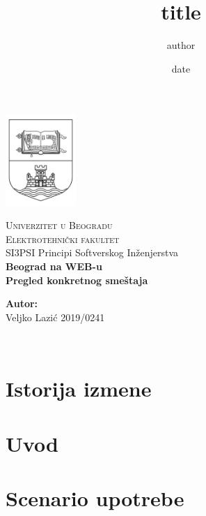 \documentclass[12pt]{report}
\begin{document}
\title{title}
\author{author}
\date{date}

\begin{titlepage}
\begin{center}
    \includegraphics[width=0.2\textwidth]{logo.jpg}
\end{center}
\begin{center}
    \textsc{ \LARGE{Univerzitet u Beogradu \\}}
	\textsc{ \LARGE{Elektrotehnički fakultet\\ }}
	\textnormal{ \LARGE{SI3PSI Principi Softverskog Inženjerstva\\}}
	\vspace{30mm}
	\fontsize{10mm}{7mm}\selectfont 
    \textbf{\textup{Beograd na WEB-u}}\\
    \textbf{Pregled konkretnog smeštaja}\\
\end{center}

\vspace{25mm}

\begin{minipage}[t]{0.47\textwidth}
	\textnormal{\large{\bf Autor:\\}}
	{\large Veljko Lazić 2019/0241}\\
\end{minipage}

\vspace{20mm}

\\

\end{titlepage}


\chapter{\color{RoyalBlue}Istorija izmene}

\chapter{\color{RoyalBlue}Uvod}

\chapter{\color{RoyalBlue}Scenario upotrebe}

\end{document}
